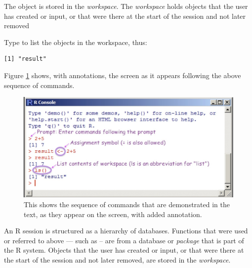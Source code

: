 The object  is stored in the \textit{workspace}.
The {\em workspace} holds objects that the user has created or input,
or that were there at the start of the session and not later removed

Type  to list the objects in the workspace, thus:
\begin{knitrout}
\color{fgcolor}\begin{kframe}
\begin{alltt}
\hlstd{> }\hlstd{()}
\end{alltt}
\begin{verbatim}
[1] "result"
\end{verbatim}
\end{kframe}
\end{knitrout}

Figure \ref{fig:cmds} shows, with annotations, the screen as
it appears following the above sequence of commands.

\begin{figure}
\includegraphics{figs-inc/01i-cmds.jpg}
\caption{This shows the sequence of commands that are demonstrated in
  the text, as they appear on the screen, with added
  annotation.\label{fig:cmds}}
\end{figure}

An R session is structured as a hierarchy of databases. Functions that
were used or referred to above --- such as  -- are from a
database or {\em package} that is part of the R system.  Objects that
the user has created or input, or that were there at the start of the
session and not later removed, are stored in the {\em workspace}.

